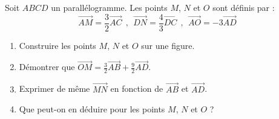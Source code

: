 
Soit $ABCD$ un parallélogramme. Les points $M$, $N$ et $O$ sont définis par :
$$\overrightarrow{AM}=\frac{3}{2}\overrightarrow{AC}~~,~~ \overrightarrow{DN}=\frac{4}{3}\overrightarrow{DC}~~,~~
\overrightarrow{AO}=-3\overrightarrow{AD}$$ 
\begin{enumerate}
\item Construire les points $M$, $N$ et $O$ sur une figure.
\item  Démontrer que $\overrightarrow{OM}=\frac{3}{2}\overrightarrow{AB}+\frac{9}{2}\overrightarrow{AD}$.
\item  Exprimer de même $\overrightarrow{MN}$ en fonction de $\overrightarrow{AB}$ et $\overrightarrow{AD}$.
\item  Que peut-on en déduire pour les points $M$, $N$ et $O$ ?\end{enumerate}